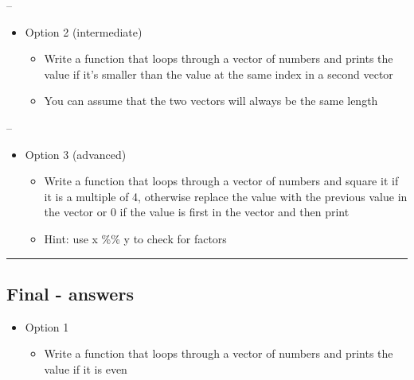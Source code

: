 \documentclass[]{article}
\providecommand{\tightlist}{%
  \setlength{\itemsep}{0pt}\setlength{\parskip}{0pt}}
\begin{document}
--

\begin{itemize}
\tightlist
\item
  Option 2 (intermediate)

  \begin{itemize}
  \tightlist
  \item
    Write a function that loops through a vector of numbers and prints
    the value if it's smaller than the value at the same index in a
    second vector
  \item
    You can assume that the two vectors will always be the same length
  \end{itemize}
\end{itemize}

--

\begin{itemize}
\tightlist
\item
  Option 3 (advanced)

  \begin{itemize}
  \tightlist
  \item
    Write a function that loops through a vector of numbers and square
    it if it is a multiple of 4, otherwise replace the value with the
    previous value in the vector or 0 if the value is first in the
    vector and then print
  \item
    Hint: use x \%\% y to check for factors
  \end{itemize}
\end{itemize}

\begin{center}\rule{0.5\linewidth}{\linethickness}\end{center}

\hypertarget{final---answers}{%
\subsection{Final - answers}\label{final---answers}}

\begin{itemize}
\tightlist
\item
  Option 1

  \begin{itemize}
  \tightlist
  \item
    Write a function that loops through a vector of numbers and prints
    the value if it is even
  \end{itemize}
\end{itemize}
\end{document}
